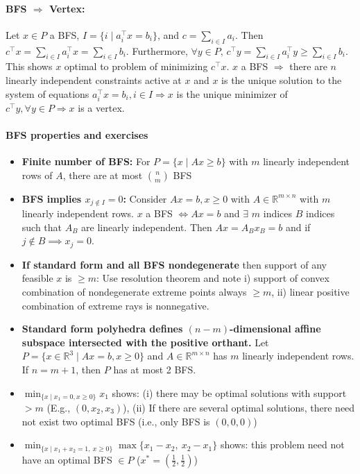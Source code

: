 \documentclass{article}
\begin{document}
\paragraph{BFS $\Rightarrow$ Vertex:} Let $x\in P$ a BFS, $I=\{i \mid a_i^\top x = b_i\}$, and $c = \sum_{i\in I}a_i$. Then $c^\top x = \sum_{i\in I}a_i^\top x = \sum_{i\in I}b_i$. Furthermore, $\forall y \in P,\, c^\top y = \sum_{i\in I}a_i^\top y \geq \sum_{i\in I}b_i$. This shows $x$ optimal to problem of minimizing $c^\top x$. $x$ a BFS $\Longrightarrow$ there are $n$ linearly independent constraints active at $x$ and $x$ is the unique solution to the system of equations $a_i^\top x = b_i, i\in I \Longrightarrow x$ is the unique minimizer of $c^\top y, \forall y\in P \Longrightarrow x$ is a vertex.

\paragraph{BFS properties and exercises}
\begin{itemize}
    \item \textbf{Finite number of BFS:} For $P = \{x \mid Ax \geq b\}$ with $m$ linearly independent rows of $A$, there are at most $\binom{n}{m}$ BFS
    
    \item \textbf{BFS implies $x_{j \notin I} = 0$:} Consider $Ax = b, x\geq 0$ with $A\in \mathbb R^{m\times n}$ with $m$ linearly independent rows. $x$ a BFS $\iff Ax = b$ and $\exists$ $m$ indices $B$ indices such that $A_B$ are linearly independent. Then $Ax = A_Bx_B = b$ and if $j \notin B \implies x_j = 0$.
    
    \item \textbf{If standard form and all BFS nondegenerate} then support of any feasible $x$ is $\geq m$: Use resolution theorem and note i) support of convex combination of nondegenerate extreme points always $\geq m$, ii) linear positive combination of extreme rays is nonnegative.

    \item \textbf{Standard form polyhedra defines $(n-m)$-dimensional affine subspace intersected with the positive orthant.} Let $P = \{x\in \mathbb R^3\mid Ax=b, x\geq0\}$ and $A\in\mathbb R^{m\times n}$ has $m$ linearly independent rows. If $n=m+1$, then $P$ has at most 2 BFS.
    
    \item $\min_{\{x\mid x_1 = 0, x\geq0\}}x_1$ shows: (i) there may be optimal solutions with support $>m$ (E.g., $(0, x_2, x_3)$), (ii) If there are several optimal solutions, there need not exist two optimal BFS (i.e., only BFS is $(0,0,0)$)
    
    \item $\min_{\{x\mid x_1 + x_2 = 1,\ x\geq 0\}}\max\{x_1 - x_2,\ x_2 - x_1\}$ shows: this problem need not have an optimal BFS $\in P$ ($x^* = (\tfrac{1}{2},\tfrac{1}{2})$)
\end{itemize}
\end{document}
